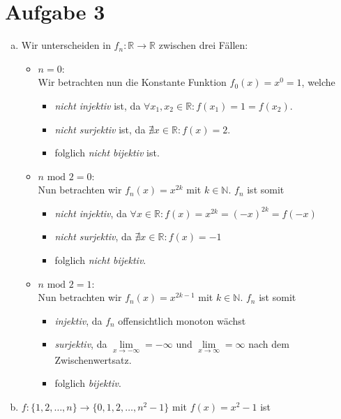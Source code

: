 \documentclass{scrreprt}
\newcommand{\NN}{\mathbb{N}}
\newcommand{\RR}{\mathbb{R}}
\begin{document}
	\section*{Aufgabe 3}
	\begin{enumerate}[a)]
		\item
			Wir unterscheiden in $f_n \colon \RR \to \RR$ zwischen drei Fällen:
			\begin{itemize}
				\item
					$n = 0$:\\
					Wir betrachten nun die Konstante Funktion $f_0(x) = x^0 = 1$, welche
					\begin{itemize}
						\item
							\emph{nicht injektiv} ist, da $\forall x_1, x_2 \in \RR: f(x_1) = 1 = f(x_2)$.
						\item
							\emph{nicht surjektiv} ist, da $\nexists x \in \RR: f(x) = 2$.
						\item
							folglich \emph{nicht bijektiv} ist.
					\end{itemize}
				\item
					$n \text{ mod }  2 = 0$:\\
					Nun betrachten wir $f_n(x) = x^{2k}$ mit $k \in \NN$. $f_n$ ist somit
					\begin{itemize}
						\item
							\emph{nicht injektiv}, da $\forall x \in \RR: f(x) = x^{2k} = (-x)^{2k} = f(-x)$
						\item
							\emph{nicht surjektiv}, da $\nexists x \in \RR: f(x) = -1$
						\item
							folglich \emph{nicht bijektiv}.
					\end{itemize}
				\item
					$n \text{ mod }  2 = 1$:\\
					Nun betrachten wir $f_n(x) = x^{2k - 1}$ mit $k \in \NN$. $f_n$ ist somit
					\begin{itemize}
						\item
							\emph{injektiv}, da $f_n$ offensichtlich monoton wächst
						\item
							\emph{surjektiv}, da $\lim\limits_{x \to -\infty} = -\infty$ und $\lim\limits_{x \to \infty} = \infty$ nach dem Zwischenwertsatz.	
						\item
							folglich \emph{bijektiv}.
					\end{itemize}
			\end{itemize}
			\item
				$f: \lbrace 1,2, \dots, n\rbrace \to \lbrace 0, 1, 2, \dots , n^2 -1 \rbrace$ mit $f(x) = x^2 -1$ ist

\end{enumerate}
\end{document}
